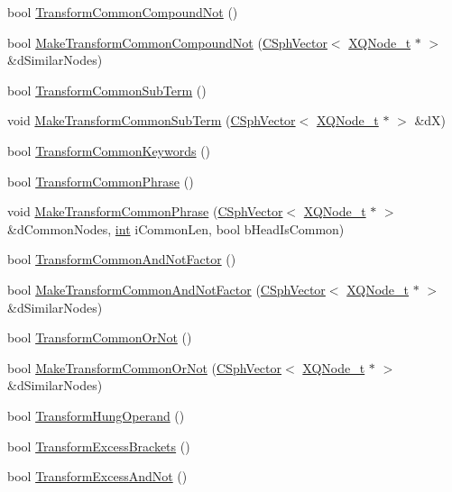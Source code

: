\begin{DoxyCompactItemize}
\item 
bool \hyperlink{classCSphTransformation_ac273e38f226a3d7f495af9036fba7e9b}{Transform\-Common\-Compound\-Not} ()
\item 
bool \hyperlink{classCSphTransformation_ae54a324f23c9b053d99baeadf832f129}{Make\-Transform\-Common\-Compound\-Not} (\hyperlink{classCSphVector}{C\-Sph\-Vector}$<$ \hyperlink{structXQNode__t}{X\-Q\-Node\-\_\-t} $\ast$ $>$ \&d\-Similar\-Nodes)
\item 
bool \hyperlink{classCSphTransformation_a4423f7a7da713db07059413fcf989819}{Transform\-Common\-Sub\-Term} ()
\item 
void \hyperlink{classCSphTransformation_aa2572a8856254cb37a3bc1ed09da8d36}{Make\-Transform\-Common\-Sub\-Term} (\hyperlink{classCSphVector}{C\-Sph\-Vector}$<$ \hyperlink{structXQNode__t}{X\-Q\-Node\-\_\-t} $\ast$ $>$ \&d\-X)
\item 
bool \hyperlink{classCSphTransformation_aa0ca5b0e3e6987611d5a2a3cc8e06890}{Transform\-Common\-Keywords} ()
\item 
bool \hyperlink{classCSphTransformation_ac6e875fd4024d231ad9178a4cddb6d5f}{Transform\-Common\-Phrase} ()
\item 
void \hyperlink{classCSphTransformation_a2c12cd3a5bb09022db8a716c76b5e51f}{Make\-Transform\-Common\-Phrase} (\hyperlink{classCSphVector}{C\-Sph\-Vector}$<$ \hyperlink{structXQNode__t}{X\-Q\-Node\-\_\-t} $\ast$ $>$ \&d\-Common\-Nodes, \hyperlink{sphinxexpr_8cpp_a4a26e8f9cb8b736e0c4cbf4d16de985e}{int} i\-Common\-Len, bool b\-Head\-Is\-Common)
\item 
bool \hyperlink{classCSphTransformation_a22f2fd7119d9928e1375628e6bc14a7f}{Transform\-Common\-And\-Not\-Factor} ()
\item 
bool \hyperlink{classCSphTransformation_a639ed326d99e11646edd04163793450c}{Make\-Transform\-Common\-And\-Not\-Factor} (\hyperlink{classCSphVector}{C\-Sph\-Vector}$<$ \hyperlink{structXQNode__t}{X\-Q\-Node\-\_\-t} $\ast$ $>$ \&d\-Similar\-Nodes)
\item 
bool \hyperlink{classCSphTransformation_ad4ab477537209c023a94f10df30c7949}{Transform\-Common\-Or\-Not} ()
\item 
bool \hyperlink{classCSphTransformation_ae864e8b4d4349e3f134cdbfb6ceae098}{Make\-Transform\-Common\-Or\-Not} (\hyperlink{classCSphVector}{C\-Sph\-Vector}$<$ \hyperlink{structXQNode__t}{X\-Q\-Node\-\_\-t} $\ast$ $>$ \&d\-Similar\-Nodes)
\item 
bool \hyperlink{classCSphTransformation_ab89941fadea01e74e93a8f278f9dfe8a}{Transform\-Hung\-Operand} ()
\item 
bool \hyperlink{classCSphTransformation_a18b4935d0c2bf3815365543401e52f75}{Transform\-Excess\-Brackets} ()
\item 
bool \hyperlink{classCSphTransformation_ad572551c4b16c15fb55e12ade9bc2e9a}{Transform\-Excess\-And\-Not} ()
\end{DoxyCompactItemize}
